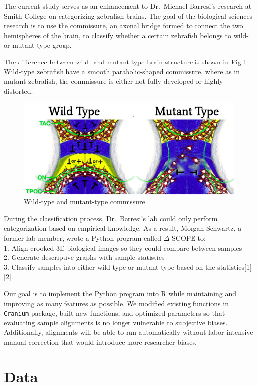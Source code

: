 \documentclass[10pt,letterpaper]{article}
\begin{document}
The current study serves as an enhancement to Dr.~Michael Barresi's
research at Smith College on categorizing zebrafish brains. The goal of
the biological sciences research is to use the commissure, an axonal
bridge formed to connect the two hemispheres of the brain, to classify
whether a certain zebrafish belongs to wild- or mutant-type group.

The difference between wild- and mutant-type brain structure is shown in
Fig.1. Wild-type zebrafish have a smooth parabolic-shaped commissure,
where as in mutant zebrafish, the commissure is either not fully
developed or highly distorted.

\begin{figure}[H]
\includegraphics[width=0.9\linewidth]{visualization_paper/wt_yt} \caption{Wild-type and mutant-type commissure}\label{fig:Figure1}
\end{figure}

During the classification process, Dr.~Barresi's lab could only perform
categorization based on empirical knowledge. As a result, Morgan
Schwartz, a former lab member, wrote a Python program called \(\Delta\)
SCOPE to:\\
1. Align crooked 3D biological images so they could compare between
samples\\
2. Generate descriptive graphs with sample statistics\\
3. Classify samples into either wild type or mutant type based on the
statistics{[}1{]} {[}2{]}.

Our goal is to implement the Python program into R while maintaining and
improving as many features as possible. We modified existing functions
in \texttt{Cranium} package, built new functions, and optimized
parameters so that evaluating sample alignments is no longer vulnerable
to subjective biases. Additionally, alignments will be able to run
automatically without labor-intensive manual correction that would
introduce more researcher biases.

\hypertarget{data}{%
\section{Data}\label{data}}
\end{document}
